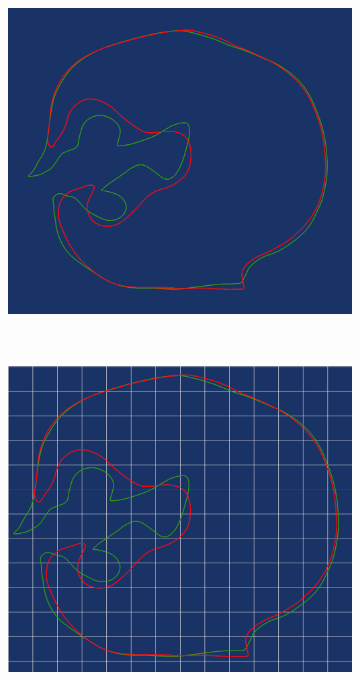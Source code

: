 \documentclass[3p,times]{elsarticle}
\begin{document}
\begin{figure}[ht]
\centering
\begin{subfigure}[b]{0.25\textwidth}
\includegraphics[width=\textwidth,height=0.15\textheight]{../picture/FFD_original_2_3.png}
\caption{}
\label{fig:FFD_original_2_3}
\end{subfigure}
~~~~~~~~~~~~~~~~~~~~
\begin{subfigure}[b]{0.25\textwidth}
\includegraphics[width=\textwidth,height=0.15\textheight]{../picture/FFD_lattice_2_3.png}
\caption{}
\label{fig:FFD_lattice_2_3}
\end{subfigure}


\end{figure}
\end{document}
